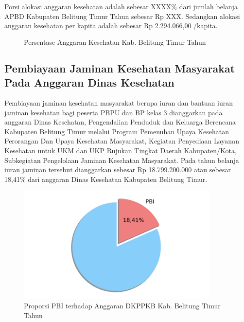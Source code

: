 Porsi alokasi anggaran kesehatan adalah sebesar XXXX\% dari jumlah belanja APBD Kabupaten Belitung Timur Tahun \tP sebesar Rp XXX. Sedangkan alokasi anggaran kesehatan per kapita adalah sebesar Rp 2.294.066,00 /kapita.

\begin{figure}[htb]
    \centering{}
    \caption{Persentase Anggaran Kesehatan Kab. Belitung Timur Tahun \tP}
    \label{fig:Anggaran-Kesehatan}
\end{figure}

\subsection{Pembiayaan Jaminan Kesehatan Masyarakat Pada Anggaran Dinas Kesehatan}
Pembiayaan jaminan kesehatan masyarakat berupa iuran dan bantuan iuran jaminan kesehatan bagi peserta PBPU dan BP kelas 3 dianggarkan pada anggaran Dinas Kesehatan, Pengendalian Penduduk dan Keluarga Berencana Kabupaten Belitung Timur melalui Program Pemenuhan Upaya Kesehatan Perorangan Dan Upaya Kesehatan Masyarakat, Kegiatan Penyediaan Layanan Kesehatan untuk UKM dan UKP Rujukan Tingkat Daerah Kabupaten/Kota, Subkegiatan Pengelolaan Jaminan Kesehatan Masyarakat. Pada tahun \tP belanja iuran jaminan tersebut dianggarkan sebesar Rp 18.799.200.000 atau sebesar 18,41\% dari anggaran Dinas Kesehatan Kabupaten Belitung Timur.

\begin{figure}[htb]
	\centering{}
	\includegraphics[width=0.9\textwidth]{bab_04/bab_04_04_proporsiPBI}
	\caption{Proporsi PBI terhadap Anggaran DKPPKB Kab. Belitung Timur Tahun \tP}
	\label{fig:Proporsi-PBI}
\end{figure}
